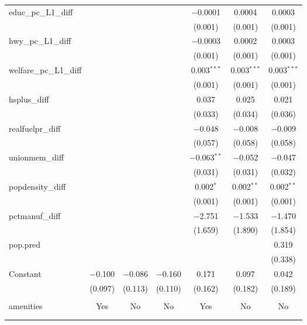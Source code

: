 \begin{table}[!htbp]
\begin{tabular}{@{\extracolsep{5pt}}lcccccc}
  educ\_pc\_L1\_diff &  &  &  & $-$0.0001 & 0.0004 & 0.0003 \\ 
  &  &  &  & (0.001) & (0.001) & (0.001) \\ 
  hwy\_pc\_L1\_diff &  &  &  & $-$0.0003 & 0.0002 & 0.0003 \\ 
  &  &  &  & (0.001) & (0.001) & (0.001) \\ 
  welfare\_pc\_L1\_diff &  &  &  & 0.003$^{***}$ & 0.003$^{***}$ & 0.003$^{***}$ \\ 
  &  &  &  & (0.001) & (0.001) & (0.001) \\ 
  hsplus\_diff &  &  &  & 0.037 & 0.025 & 0.021 \\ 
  &  &  &  & (0.033) & (0.034) & (0.036) \\ 
  realfuelpr\_diff &  &  &  & $-$0.048 & $-$0.008 & $-$0.009 \\ 
  &  &  &  & (0.057) & (0.058) & (0.058) \\ 
  unionmem\_diff &  &  &  & $-$0.063$^{**}$ & $-$0.052 & $-$0.047 \\ 
  &  &  &  & (0.031) & (0.031) & (0.032) \\ 
  popdensity\_diff &  &  &  & 0.002$^{*}$ & 0.002$^{**}$ & 0.002$^{**}$ \\ 
  &  &  &  & (0.001) & (0.001) & (0.001) \\ 
  pctmanuf\_diff &  &  &  & $-$2.751 & $-$1.533 & $-$1.470 \\ 
  &  &  &  & (1.659) & (1.890) & (1.854) \\ 
  pop.pred &  &  &  &  &  & 0.319 \\ 
  &  &  &  &  &  & (0.338) \\ 
  Constant & $-$0.100 & $-$0.086 & $-$0.160 & 0.171 & 0.097 & 0.042 \\ 
  & (0.097) & (0.113) & (0.110) & (0.162) & (0.182) & (0.189) \\ 
 \hline \\[-1.8ex] 
amenities & Yes & No & No & Yes & No & No \\ 
\hline \\[-1.8ex] 
\hline 
\hline \\[-1.8ex] 
\end{tabular} 
\end{table} 

